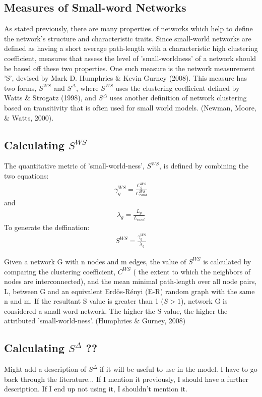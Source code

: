\documentclass[11pt,letterpaper,doublespacing,titlepage]{article}
\begin{document}
\subsection{Measures of Small-word Networks}
\par
As stated previously, there are many properties of networks which help to define the network's structure and characteristic traits. Since small-world networks are defined as having a short average path-length with a characteristic high clustering coefficient, measures that assess the level of 'small-worldness' of a network should be based off these two properties. One such measure is the network measurement 'S', devised by Mark D. Humphries \& Kevin Gurney (2008).  This measure has two forms, $S^{WS}$  and $S^{\Delta}$, where $S^{WS}$  uses the clustering coefficient defined by Watts \& Strogatz (1998), and $S^{\Delta}$  uses another definition of network clustering based on transitivity that is often used for small world models. (Newman, Moore, \& Watts, 2000). 
\subsection{Calculating  $S^{WS}$}
\par
The quantitative metric of 'small-world-ness', $S^{WS}$, is defined by combining the two equations:
\begin{eqnarray}
\gamma_g^{WS} = \frac{C_g^{WS}}{C_{rand}^{WS}}
\end{eqnarray}
and
\begin{eqnarray}
\lambda_g = \frac{L_g}{L_{rand}}
\end{eqnarray}
To generate the deffination:
\begin{eqnarray}
S^{WS} = \frac{\gamma_g^{WS}}{\lambda_g}
\end{eqnarray}
\par
Given a network G with n nodes and m edges, the value of $S^{WS}$ is calculated by comparing the clustering coefficient, $C^{WS}$  ( the extent to which the neighbors of nodes are interconnected), and the mean minimal path-length over all node pairs, L, between G and an equivalent Erdös-Rényi (E-R) random graph with the same n and m. If the resultant S value is greater than 1 ($ S > 1 $), network G is considered a small-word network. The higher the S value, the higher the attributed 'small-world-ness'. (Humphries \& Gurney, 2008)
\subsection{Calculating $S^{\Delta}$ ??}
\par
Might add a description of $S^{\Delta}$ if it will be useful to use in the model. I have to go back through the literature... If I mention it previously, I should have a further description. If I end up not using it, I shouldn't mention it.
\end{document}
